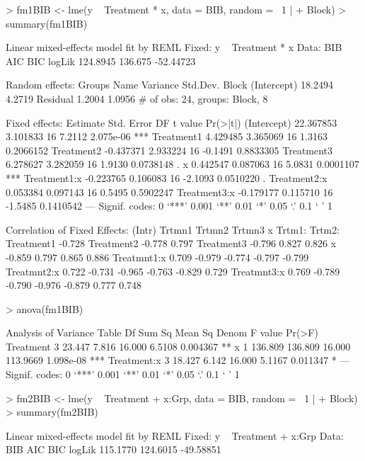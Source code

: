 \documentclass[12pt]{article}
\begin{document}
\begin{Schunk}
\begin{Sinput}
> fm1BIB <- lme(y ~ Treatment * x, data = BIB, random = ~1 | 
+     Block)
> summary(fm1BIB)
\end{Sinput}
\begin{Soutput}
Linear mixed-effects model fit by REML
Fixed: y ~ Treatment * x 
 Data: BIB 
      AIC     BIC    logLik
 124.8945 136.675 -52.44723

Random effects:
 Groups   Name        Variance Std.Dev.
 Block    (Intercept) 18.2494  4.2719  
 Residual              1.2004  1.0956  
# of obs: 24, groups: Block, 8

Fixed effects:
              Estimate Std. Error DF t value  Pr(>|t|)    
(Intercept)  22.367853   3.101833 16  7.2112 2.075e-06 ***
Treatment1    4.429485   3.365069 16  1.3163 0.2066152    
Treatment2   -0.437371   2.933224 16 -0.1491 0.8833305    
Treatment3    6.278627   3.282059 16  1.9130 0.0738148 .  
x             0.442547   0.087063 16  5.0831 0.0001107 ***
Treatment1:x -0.223765   0.106083 16 -2.1093 0.0510220 .  
Treatment2:x  0.053384   0.097143 16  0.5495 0.5902247    
Treatment3:x -0.179177   0.115710 16 -1.5485 0.1410542    
---
Signif. codes:  0 `***' 0.001 `**' 0.01 `*' 0.05 `.' 0.1 ` ' 1 

Correlation of Fixed Effects:
            (Intr) Trtmn1 Trtmn2 Trtmn3 x      Trtm1: Trtm2:
Treatment1  -0.728                                          
Treatment2  -0.778  0.797                                   
Treatment3  -0.796  0.827  0.826                            
x           -0.859  0.797  0.865  0.886                     
Treatmnt1:x  0.709 -0.979 -0.774 -0.797 -0.799              
Treatmnt2:x  0.722 -0.731 -0.965 -0.763 -0.829  0.729       
Treatmnt3:x  0.769 -0.789 -0.790 -0.976 -0.879  0.777  0.748
\end{Soutput}
\begin{Sinput}
> anova(fm1BIB)
\end{Sinput}
\begin{Soutput}
Analysis of Variance Table
            Df  Sum Sq Mean Sq   Denom  F value    Pr(>F)    
Treatment    3  23.447   7.816  16.000   6.5108  0.004367 ** 
x            1 136.809 136.809  16.000 113.9669 1.098e-08 ***
Treatment:x  3  18.427   6.142  16.000   5.1167  0.011347 *  
---
Signif. codes:  0 `***' 0.001 `**' 0.01 `*' 0.05 `.' 0.1 ` ' 1 
\end{Soutput}
\begin{Sinput}
> fm2BIB <- lme(y ~ Treatment + x:Grp, data = BIB, random = ~1 | 
+     Block)
> summary(fm2BIB)
\end{Sinput}
\begin{Soutput}
Linear mixed-effects model fit by REML
Fixed: y ~ Treatment + x:Grp 
 Data: BIB 
      AIC      BIC    logLik
 115.1770 124.6015 -49.58851


\end{Soutput}
\end{Schunk}
\end{document}

